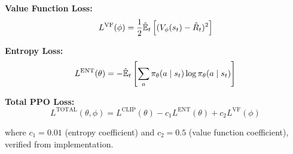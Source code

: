\documentclass[12pt,twoside]{article}
\theoremstyle{definition}
\theoremstyle{plain}
\begin{document}
\textbf{Value Function Loss:}
\begin{equation}
L^{\text{VF}}(\phi) = \frac{1}{2}\hat{\mathbb{E}}_t\left[(V_\phi(s_t) - \hat{R}_t)^2\right]
\end{equation}

\textbf{Entropy Loss:}
\begin{equation}
L^{\text{ENT}}(\theta) = -\hat{\mathbb{E}}_t\left[\sum_a \pi_\theta(a \mid s_t) \log \pi_\theta(a \mid s_t)\right]
\end{equation}

\textbf{Total PPO Loss:}
\begin{equation}
L^{\text{TOTAL}}(\theta, \phi) = L^{\text{CLIP}}(\theta) - c_1 L^{\text{ENT}}(\theta) + c_2 L^{\text{VF}}(\phi)
\end{equation}

where $c_1 = 0.01$ (entropy coefficient) and $c_2 = 0.5$ (value function coefficient), verified from implementation.
\end{document}
